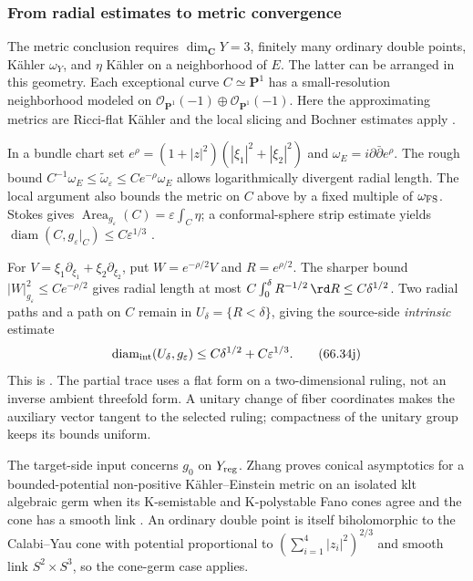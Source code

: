 \subsubsection{From radial estimates to metric convergence}

The metric conclusion requires $\dim_{\mathbf C}Y=3$, finitely many
ordinary double points, K\"ahler $\omega_Y$, and $\eta$ K\"ahler on
a neighborhood of $E$. The latter can be arranged in this geometry.
Each exceptional curve $C\simeq\mathbf P^1$ has a small-resolution
neighborhood modeled on
$\mathcal O_{\mathbf P^1}(-1)\oplus\mathcal O_{\mathbf P^1}(-1)$.
Here the approximating metrics are Ricci-flat K\"ahler and the local
slicing and Bochner estimates apply
\cite[Propositions~4.1--4.4]{Song12ConifoldV1}.

In a bundle chart set
$e^\rho=(1+|z|^2)(|\xi_1|^2+|\xi_2|^2)$ and
$\omega_E=i\partial\bar\partial e^\rho$.
The rough bound
$C^{-1}\omega_E\leq\widetilde\omega_\varepsilon
\leq Ce^{-\rho}\omega_E$ allows logarithmically divergent radial
length. The local argument also bounds the metric on $C$ above by
a fixed multiple of $\omega_{\rm FS}$. Stokes gives
$\operatorname{Area}_{g_\varepsilon}(C)=\varepsilon\int_C\eta$;
a conformal-sphere strip estimate yields
$\operatorname{diam}(C,g_\varepsilon|_C)\leq C\varepsilon^{1/3}$
\cite[Lemma~4.1]{GuyettMcGowan26ConifoldV1}.

For $V=\xi_1\partial_{\xi_1}+\xi_2\partial_{\xi_2}$, put
$W=e^{-\rho/2}V$ and $R=e^{\rho/2}$.
The sharper bound $|W|_{g_\varepsilon}^2\leq Ce^{-\rho/2}$
gives radial length at most
$C\int_0^\delta R^{-1/2}\,\rd R\leq C\delta^{1/2}$.
Two radial paths and a path on $C$ remain in $U_\delta=\{R<\delta\}$,
giving the source-side \emph{intrinsic} estimate
\[
 \operatorname{diam}_{\rm int}(U_\delta,g_\varepsilon)
       \leq C\delta^{1/2}+C\varepsilon^{1/3}.
\tag{66.34j}\label{eq:hybrid-conifold-source-diameter}
\]
This is \cite[Proposition~4.2]{GuyettMcGowan26ConifoldV1}.
The partial trace uses a flat form on a two-dimensional ruling,
not an inverse ambient threefold form. A unitary change of fiber
coordinates makes the auxiliary vector tangent to the selected ruling;
compactness of the unitary group keeps its bounds uniform.

The target-side input concerns $g_0$ on $Y_{\rm reg}$.
Zhang proves conical asymptotics for a bounded-potential non-positive
K\"ahler--Einstein metric on an isolated klt algebraic germ when its
K-semistable and K-polystable Fano cones agree and the cone has a
smooth link \cite[Theorem~1.4]{Zhang25TangentConesPublished}.
An ordinary double point is itself biholomorphic to the Calabi--Yau
cone with potential proportional to $(\sum_{i=1}^4|z_i|^2)^{2/3}$
and smooth link $S^2\times S^3$, so the cone-germ case applies.

